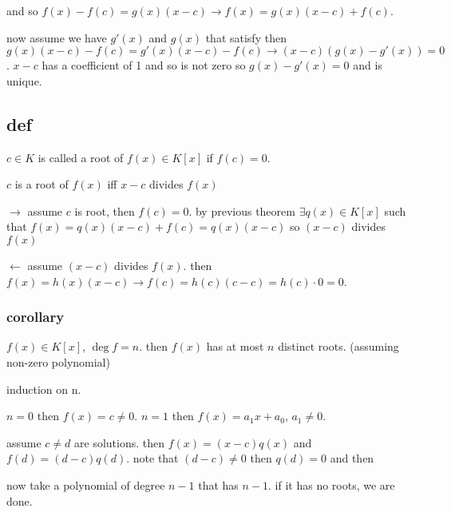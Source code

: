 \documentclass[letterpaper]{article}
\begin{document}
and so $f(x)-f(c)=g(x)(x-c)\to f(x)=g(x)(x-c)+f(c)$.

now assume we have $g'(x)$ and $g(x)$ that satisfy then $g(x)(x-c)-f(c)=g'(x)(x-c)-f(c)\to (x-c)(g(x)-g'(x))=0$. $x-c$ has a coefficient of 1 and so is not zero so $g(x)-g'(x)=0$ and is unique.

\subsection*{def}
$c\in K$ is called a root of $f(x)\in K[x]$ if $f(c)=0$.

$c$ is a root of $f(x)$ iff $x-c$ divides $f(x)$

$\to$ assume $c$ is root, then $f(c)=0$. by previous theorem $\exists q(x)\in K[x]$ such that $f(x)=q(x)(x-c)+f(c)=q(x)(x-c)$ so $(x-c)$ divides $f(x)$

$\leftarrow$ assume $(x-c)$ divides $f(x)$. then $f(x)=h(x)(x-c)\to f(c)=h(c)(c-c)=h(c)\cdot 0=0$.

\subsubsection*{corollary}
$f(x)\in K[x]$, $\deg f=n$. then $f(x)$ has at most $n$ distinct roots. (assuming non-zero polynomial)

induction  on n.

$n=0$ then $f(x)=c\ne 0$. $n=1$ then $f(x)=a_1x+a_0$, $a_1\ne 0$.

assume $c\ne d$ are solutions. then $f(x)=(x-c)q(x)$ and $f(d)=(d-c)q(d)$. note that $(d-c)\ne 0$ then $q(d)=0$ and then 

now take a polynomial of degree $n-1$ that has $n-1$. if it has no roots, we are done. 
\end{document}
